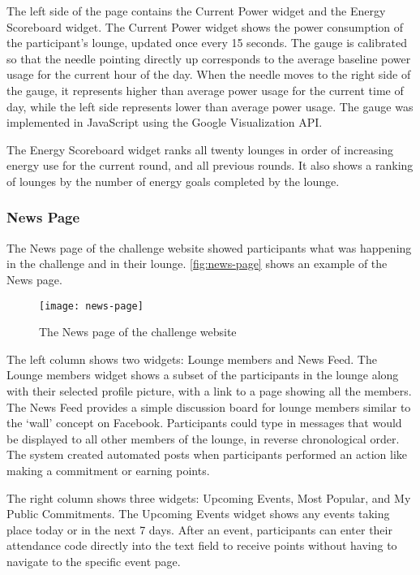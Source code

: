 The left side of the page contains the Current Power widget and the Energy Scoreboard widget. The Current Power widget shows the power consumption of the participant's lounge, updated once every 15 seconds. The gauge is calibrated so that the needle pointing directly up corresponds to the average baseline power usage for the current hour of the day. When the needle moves to the right side of the gauge, it represents higher than average power usage for the current time of day, while the left side represents lower than average power usage. The gauge was implemented in JavaScript using the Google Visualization API.

The Energy Scoreboard widget ranks all twenty lounges in order of increasing energy use for the current round, and all previous rounds. It also shows a ranking of lounges by the number of energy goals completed by the lounge.


\subsubsection{News Page}
\label{sec:news-page}

The News page of the challenge website showed participants what was happening in the challenge and in their lounge. \autoref{fig:news-page} shows an example of the News page.

\begin{figure}[htbp]
	\centering
		\texttt{[image: news-page]}
		\caption{The News page of the challenge website}
\label{fig:news-page}
\end{figure}

The left column shows two widgets: Lounge members and News Feed. The Lounge members widget shows a subset of the participants in the lounge along with their selected profile picture, with a link to a page showing all the members. The News Feed provides a simple discussion board for lounge members similar to the `wall' concept on Facebook. Participants could type in messages that would be displayed to all other members of the lounge, in reverse chronological order. The system created automated posts when participants performed an action like making a commitment or earning points.

The right column shows three widgets: Upcoming Events, Most Popular, and My Public Commitments. The Upcoming Events widget shows any events taking place today or in the next 7 days. After an event, participants can enter their attendance code directly into the text field to receive points without having to navigate to the specific event page.

